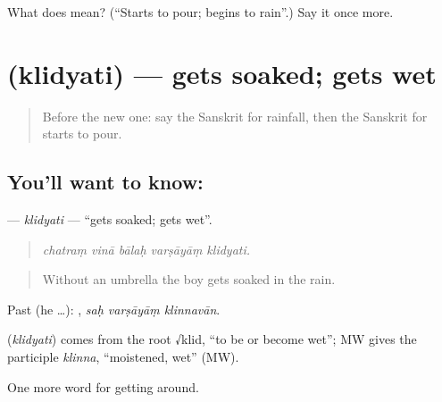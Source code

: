 \begin{tcolorbox}[breakable,colback=teal!4,colframe=teal!35!black,title={Before you move on}]
What does  mean? (\textquotedblleft{}Starts to pour; begins to rain\textquotedblright{}.) Say it once more.
\end{tcolorbox}
\section[\texorpdfstring{\sk{क्लिद्यति} (klidyati)}{क्लिद्यति (klidyati)}]{ (klidyati) — gets soaked; gets wet}

\label{lesson:SA-C436-klidyati}



\begin{quote}
Before the new one: say the Sanskrit for rainfall, then the Sanskrit for starts to pour.
\end{quote}

\subsection*{You'll want to know: }
\textbf{} — \emph{klidyati} — \textquotedblleft{}gets soaked; gets wet\textquotedblright{}.

\begin{quote}
    
\end{quote}

\begin{quote}
\emph{chatraṃ vinā bālaḥ varṣāyāṃ klidyati.}
\end{quote}

\begin{quote}
Without an umbrella the boy gets soaked in the rain.
\end{quote}

Past (he …):   , \emph{saḥ varṣāyāṃ klinnavān}.

\begin{cousinweb}
\textbf{} (\emph{klidyati}) comes from the root √klid, \textquotedblleft{}to be or become wet\textquotedblright{}; MW gives the participle \emph{klinna}, \textquotedblleft{}moistened, wet\textquotedblright{} (MW).
\end{cousinweb}

\begin{grammarlens}[title={What you've built}]
One more word for getting around.
\end{grammarlens}


